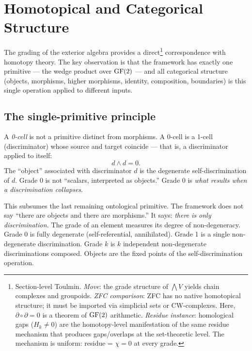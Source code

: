 \section{Homotopical and Categorical Structure}\label{sec:homotopy}

The grading of the exterior algebra provides a direct\footnote{Section-level Toulmin. \emph{Move}: the grade structure of $\bigwedge V$ yields chain complexes and groupoids. \emph{ZFC comparison}: ZFC has no native homotopical structure; it must be imported via simplicial sets or CW-complexes. Here, $\partial \circ \partial = 0$ is a theorem of $\operatorname{GF}(2)$ arithmetic. \emph{Residue instance}: homological gaps ($H_k \neq 0$) are the homotopy-level manifestation of the same residue mechanism that produces gaps/overlaps at the set-theoretic level. The mechanism is uniform: residue = $\chi = 0$ at every grade.}
correspondence with homotopy theory. The key observation
is that the framework has exactly one primitive --- the
wedge product over $\operatorname{GF}(2)$ --- and all categorical
structure (objects, morphisms, higher morphisms, identity,
composition, boundaries) is this single operation applied
to different inputs.

\subsection{The single-primitive principle}

\begin{definition}\label{def:degeneracy}
A \emph{0-cell} is not a primitive distinct from morphisms.
A 0-cell is a 1-cell (discriminator) whose source and target
coincide --- that is, a discriminator applied to itself:
\begin{equation}\label{eq:object-as-loop}
  d \wedge d = 0.
\end{equation}
The ``object'' associated with discriminator $d$ is the
degenerate self-discrimination of $d$. Grade 0 is not
``scalars, interpreted as objects.'' Grade 0 is \emph{what
results when a discrimination collapses}.
\end{definition}

\begin{remark}
This subsumes the last remaining ontological primitive.
The framework does not say ``there are objects and there are
morphisms.'' It says: \emph{there is only discrimination.}
The grade of an element measures its degree of
non-degeneracy. Grade 0 is fully degenerate
(self-referential, annihilated). Grade 1 is a single
non-degenerate discrimination. Grade $k$ is $k$ independent
non-degenerate discriminations composed. Objects are the
fixed points of the self-discrimination operation.
\end{remark}

